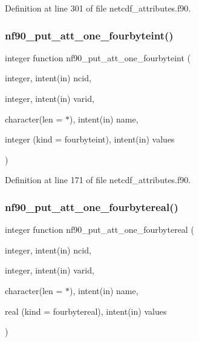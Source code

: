 Definition at line 301 of file netcdf\+\_\+attributes.\+f90.

\mbox{\label{netcdf__attributes_8f90_ad7b0acbaf6fa3759dfa83e4f473bde8b}} 
\subsubsection{\texorpdfstring{nf90\+\_\+put\+\_\+att\+\_\+one\+\_\+fourbyteint()}{nf90\_put\_att\_one\_fourbyteint()}}
{\footnotesize\ttfamily integer function nf90\+\_\+put\+\_\+att\+\_\+one\+\_\+fourbyteint (\begin{DoxyParamCaption}\item[{integer, intent(in)}]{ncid,  }\item[{integer, intent(in)}]{varid,  }\item[{character(len = $\ast$), intent(in)}]{name,  }\item[{integer (kind = fourbyteint), intent(in)}]{values }\end{DoxyParamCaption})}



Definition at line 171 of file netcdf\+\_\+attributes.\+f90.

\mbox{\label{netcdf__attributes_8f90_aedfd0d57d585bb455050d55f04872273}} 
\subsubsection{\texorpdfstring{nf90\+\_\+put\+\_\+att\+\_\+one\+\_\+fourbytereal()}{nf90\_put\_att\_one\_fourbytereal()}}
{\footnotesize\ttfamily integer function nf90\+\_\+put\+\_\+att\+\_\+one\+\_\+fourbytereal (\begin{DoxyParamCaption}\item[{integer, intent(in)}]{ncid,  }\item[{integer, intent(in)}]{varid,  }\item[{character(len = $\ast$), intent(in)}]{name,  }\item[{real (kind = fourbytereal), intent(in)}]{values }\end{DoxyParamCaption})}



